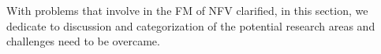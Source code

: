 \label{research}

With problems that involve in the FM of NFV clarified, in this section, we
dedicate to discussion and categorization of the potential research areas and
challenges need to be overcame. 
